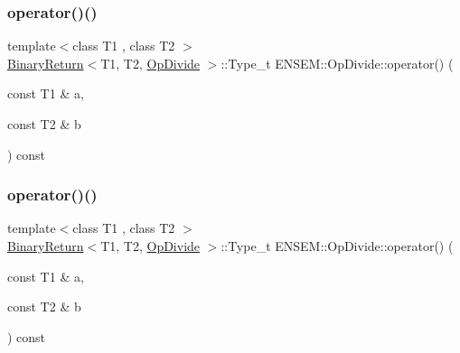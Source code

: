 \subsubsection{\texorpdfstring{operator()()}{operator()()}\hspace{0.1cm}{\footnotesize\ttfamily [1/3]}}
{\footnotesize\ttfamily template$<$class T1 , class T2 $>$ \\
\mbox{\hyperlink{structENSEM_1_1BinaryReturn}{Binary\+Return}}$<$T1, T2, \mbox{\hyperlink{structENSEM_1_1OpDivide}{Op\+Divide}} $>$\+::Type\+\_\+t E\+N\+S\+E\+M\+::\+Op\+Divide\+::operator() (\begin{DoxyParamCaption}\item[{const T1 \&}]{a,  }\item[{const T2 \&}]{b }\end{DoxyParamCaption}) const\hspace{0.3cm}{\ttfamily [inline]}}

\mbox{\label{structENSEM_1_1OpDivide_a20d785467177a704a754587d984736c3}} 
\subsubsection{\texorpdfstring{operator()()}{operator()()}\hspace{0.1cm}{\footnotesize\ttfamily [2/3]}}
{\footnotesize\ttfamily template$<$class T1 , class T2 $>$ \\
\mbox{\hyperlink{structENSEM_1_1BinaryReturn}{Binary\+Return}}$<$T1, T2, \mbox{\hyperlink{structENSEM_1_1OpDivide}{Op\+Divide}} $>$\+::Type\+\_\+t E\+N\+S\+E\+M\+::\+Op\+Divide\+::operator() (\begin{DoxyParamCaption}\item[{const T1 \&}]{a,  }\item[{const T2 \&}]{b }\end{DoxyParamCaption}) const\hspace{0.3cm}{\ttfamily [inline]}}

\mbox{\label{structENSEM_1_1OpDivide_a20d785467177a704a754587d984736c3}} 
